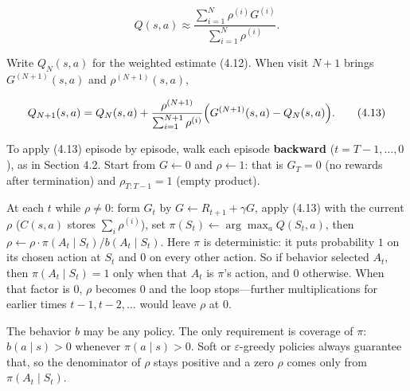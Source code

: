 \begin{equation}
Q(s,a)
\approx
\frac{\sum_{i=1}^{N}\rho^{(i)}G^{(i)}}{\sum_{i=1}^{N}\rho^{(i)}}.
\tag{4.12}
\end{equation}

Write $Q_N(s,a)$ for the weighted estimate (4.12). When visit $N{+}1$ brings $G^{(N+1)}(s,a)$ and $\rho^{(N+1)}(s,a)$,

\begin{equation}
Q_{N+1}(s,a)
=
Q_N(s,a)
+
\frac{\rho^{(N+1)}}{\sum_{i=1}^{N+1} \rho^{(i)}}
\Bigl(
G^{(N+1)}(s,a) - Q_N(s,a)
\Bigr).
\tag{4.13}
\end{equation}

To apply (4.13) episode by episode, walk each episode \textbf{backward} ($t=T{-}1,\ldots,0$), as in Section 4.2. Start from $G\leftarrow 0$ and $\rho\leftarrow 1$: that is $G_T=0$ (no rewards after termination) and $\rho_{T:T-1}=1$ (empty product).

At each $t$ while $\rho\neq 0$: form $G_t$ by $G\leftarrow R_{t+1}+\gamma G$, apply (4.13) with the current $\rho$ ($C(s,a)$ stores $\sum_i\rho^{(i)}$), set $\pi(S_t)\leftarrow\arg\max_a Q(S_t,a)$, then $\rho\leftarrow\rho\cdot\pi(A_t\mid S_t)/b(A_t\mid S_t)$. Here $\pi$ is deterministic: it puts probability $1$ on its chosen action at $S_t$ and $0$ on every other action. So if behavior selected $A_t$, then $\pi(A_t\mid S_t)=1$ only when that $A_t$ is $\pi$'s action, and $0$ otherwise. When that factor is $0$, $\rho$ becomes $0$ and the loop stops---further multiplications for earlier times $t{-}1,t{-}2,\ldots$ would leave $\rho$ at $0$.

The behavior $b$ may be any policy. The only requirement is coverage of $\pi$: $b(a\mid s)>0$ whenever $\pi(a\mid s)>0$. Soft or $\varepsilon$-greedy policies always guarantee that, so the denominator of $\rho$ stays positive and a zero $\rho$ comes only from $\pi(A_t\mid S_t)$.

